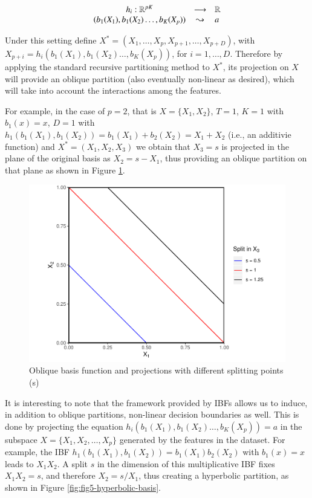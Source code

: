 \documentclass[]{elsarticle} %
\makeatletter
\def\maxwidth{\ifdim\Gin@nat@width>\linewidth\linewidth
\else\Gin@nat@width\fi}
\let\Oldincludegraphics\includegraphics
\renewcommand{\includegraphics}[1]{\Oldincludegraphics[width=\maxwidth]{#1}}
\makeatother
\begin{document}
\[
\begin{array}{ccl}h_{i}:\mathbb{R}^{pK}&\longrightarrow&\mathbb{R}\\{\tiny (b_1(X_1),b_1(X_2)\dots, b_K(X_p))}&\leadsto &a\end{array}
\]

Under this setting define
\(X^{\ast }=\left( X_{1},\dots,X_{p},X_{p+1},\dots ,X_{p+D} \right)\),
with \(X_{p+i}=h_i(b_1(X_1),b_1(X_2)\dots, b_K(X_p))\), for
\(i=1,\dots ,D\). Therefore by applying the standard recursive
partitioning method to \(X^\ast\), its projection on \(X\) will provide
an oblique partition (also eventually non-linear as desired), which will
take into account the interactions among the features.

For example, in the case of \(p=2\), that is \(X=\{X_1,X_2\}\), \(T=1\),
\(K=1\) with \(b_1(x)=x\), \(D=1\) with
\(h_1(b_1(X_1),b_1(X_2))=b_1(X_1)+b_2(X_2)=X_1+X_2\) (i.e., an additivie
function) and \(X^{\ast }=\left( X_{1},X_{2},X_{3} \right)\) we obtain
that \(X_3=s\) is projected in the plane of the original basis as
\(X_2=s-X_1\), thus providing an oblique partition on that plane as
shown in Figure \ref{fig:fig4-additive-basis}.

\begin{figure}[htbp]
\centering
\includegraphics{Trees_with_Base_Functions_v2_files/figure-latex/fig4-additive-basis-1.pdf}
\caption{\label{fig:fig4-additive-basis}Oblique basis function and
projections with different splitting points (s)}
\end{figure}

It is interesting to note that the framework provided by IBFs allows us
to induce, in addition to oblique partitions, non-linear decision
boundaries as well. This is done by projecting the equation
\(h_i(b_1(X_1),b_1(X_2)\dots, b_K(X_p))=a\) in the subspace
\(X=\{X_1, X_2,\dots, X_p\}\) generated by the features in the dataset.
For example, the IBF \(h_1(b_1(X_1),b_1(X_2))=b_1(X_1)b_2(X_2)\) with
\(b_1(x)=x\) leads to \(X_1X_2\). A split \(s\) in the dimension of this
multiplicative IBF fixes \(X_1X_2=s\), and therefore \(X_2=s/X_1\), thus
creating a hyperbolic partition, as shown in Figure
\ref{fig:fig5-hyperbolic-basis}.
\end{document}
